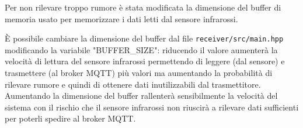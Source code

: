 \documentclass[a4paper,11pt]{article}
\begin{document}
    Per non rilevare troppo rumore è stata modificata la dimensione del buffer di memoria usato per memorizzare i dati letti dal sensore infrarossi.

    È possibile cambiare la dimensione del buffer dal file \texttt{receiver/src/main.hpp} modificando la variabile "BUFFER\_SIZE": riducendo il valore aumenterà la velocità di lettura 
    del sensore infrarossi permettendo di leggere (dal sensore) e trasmettere (al broker MQTT) più valori ma aumentando la probabilità di rilevare rumore e quindi di ottenere dati inutilizzabili dal trasmettitore.
    Aumentando la dimensione del buffer rallenterà sensibilmente la velocità del sistema con il rischio che il sensore infrarossi non riuscirà a rilevare dati sufficienti per poterli spedire al broker MQTT.

\clearpage

\listoffigures
{}
\end{document}
